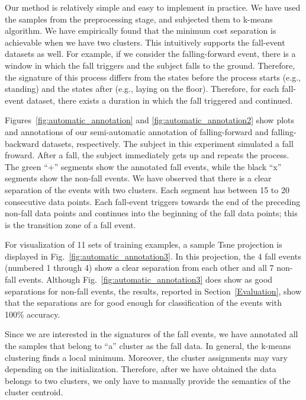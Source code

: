 \documentclass[]{IEEEtran}
\begin{document}
Our method is relatively simple and easy to implement in practice. We have used
the samples from the preprocessing stage, and subjected them to k-means
algorithm. We have empirically found that the minimum cost separation is
achievable when we have two clusters. This intuitively supports the fall-event
datasets as well. For example, if we consider the falling-forward event, there
is a window in which the fall triggers and the subject falls to the ground.
Therefore, the signature of this process differs from the states before the
process starts (e.g., standing) and the states after (e.g., laying on the
floor). Therefore, for each fall-event dataset, there exists a duration in which the fall
triggered and continued.

Figures~\ref{fig:automatic_annotation} and \ref{fig:automatic_annotation2} show
plots and annotations of our semi-automatic annotation of falling-forward  and
falling-backward datasets, respectively. The subject in this experiment
simulated a fall froward. After a fall, the subject immediately gets up and
repeats the process. The green ``+'' segments show the annotated fall events,
while the black ``x'' segments show the non-fall events. We have observed that
there is a clear separation of the events with two clusters. Each segment has
between 15 to 20 consecutive data points.
Each fall-event triggers towards the end of the preceding non-fall data points
and continues into the beginning of the fall data points; this is the
transition zone of a fall event.

\par For visualization of 11 sets of training examples, a sample Tsne
projection  is displayed in Fig.~\ref{fig:automatic_annotation3}. In this
projection, the 4 fall events (numbered 1 through 4) show a clear separation
from each other and all 7 non-fall events. Although Fig.~\ref{fig:automatic_annotation3} does show as good separations for non-fall events, the results, reported in Section~\ref{Evaluation}, show that the separations are for good enough for classification of the events with 100\%
accuracy.

Since we are interested in the signatures of the fall events, we have annotated
all the samples  that belong to ``a'' cluster as the fall data. In general, the
k-means clustering finds a local minimum. Moreover, the cluster assignments may
vary depending on the initialization. Therefore, after we have obtained the
data belongs to two clusters, we only have to manually provide the semantics of
the cluster centroid. 
\end{document}
